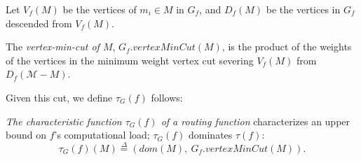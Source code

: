 



\begin{definition} Let $V_f(M)$ be the vertices of $m_i \in M$ in $G_f$, and $D_f(M)$ be the vertices in $G_f$ descended from $V_f(M)$. 
\vspace{2mm}

The {\em vertex-min-cut of $M$}, $G_f.vertexMinCut(M)$, is the product of the weights of the vertices in the minimum weight vertex cut severing $V_f(M)$ from $D_f(\mathcal{M} -M)$.
\end{definition}



Given this cut, we define $\tau_G(f)$ follows:



\begin{definition} {\em The characteristic function $\tau_G(f)$ of a routing function} characterizes an upper bound on $f$'s computational load; $\tau_G(f)$ dominates $\tau(f)$:
\begin{equation*}
\tau_G(f)(M) \overset{\Delta}{=} (dom(M),\ G_f.vertexMinCut(M)).
\end{equation*}
\end{definition}

